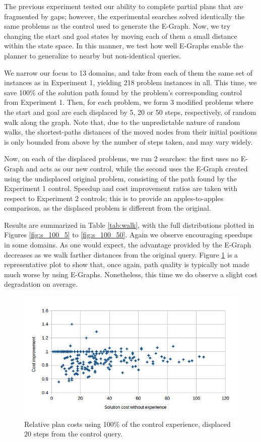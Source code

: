 \documentclass[letterpaper]{article}
\begin{document}
The previous experiment tested our ability to complete partial plans that are fragmented by gaps; however, the experimental searches solved identically the same problems as the control used to generate the E-Graph.
Now, we try changing the start and goal states by moving each of them a small distance within the state space. 
In this manner, we test how well E-Graphs enable the planner to generalize to nearby but non-identical queries.

We narrow our focus to 13 domains, and take from each of them the same set of instances as in Experiment 1, yielding 218 problem instances in all.
This time, we save 100\% of the solution path found by the problem's corresponding control from Experiment 1.
Then, for each problem, we form 3 modified problems where the start and goal are each displaced by 5, 20 or 50 steps, respectively, of random walk along the graph.
Note that, due to the unpredictable nature of random walks, the shortest-paths distances of the moved nodes from their initial positions is only bounded from above by the number of steps taken, and may vary widely.

Now, on each of the displaced problems, we run 2 searches: the first uses no E-Graph and acts as our new control, while the second uses the E-Graph created using the undisplaced original problem, consisting of the path found by the Experiment 1 control. Speedup and cost improvement ratios are taken with respect to Experiment 2 controls; this is to provide an apples-to-apples comparison, as the displaced problem is different from the original.

Results are summarized in Table \ref{tab:walk}, with the full distributions plotted in Figures \ref{fig:s_100_5} to \ref{fig:s_100_50}.
Again we observe encouraging speedups in some domains. As one would expect, the advantage provided by the E-Graph decreases as we walk farther distances from the original query. Figure \ref{fig:c_100_20} is a representative plot to show that, once again, path quality is typically not made much worse by using E-Graphs. Nonetheless, this time we do observe a slight cost degradation on average.

\begin{figure}
	\centering
	\includegraphics[scale=0.5]{Cost_100_20.png}
	\caption{Relative plan costs using 100\% of the control experience, displaced 20 steps from the control query.}
	 \label{fig:c_100_20}
\end{figure}
\end{document}
